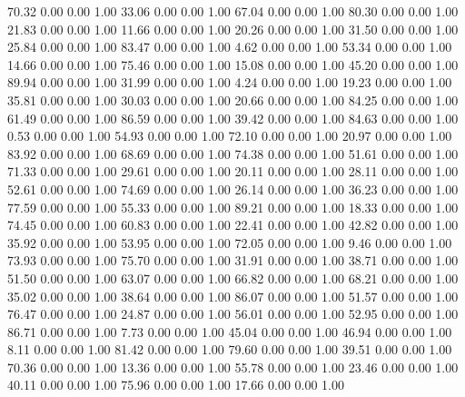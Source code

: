    70.32   0.00   0.00   1.00
   33.06   0.00   0.00   1.00
   67.04   0.00   0.00   1.00
   80.30   0.00   0.00   1.00
   21.83   0.00   0.00   1.00
   11.66   0.00   0.00   1.00
   20.26   0.00   0.00   1.00
   31.50   0.00   0.00   1.00
   25.84   0.00   0.00   1.00
   83.47   0.00   0.00   1.00
    4.62   0.00   0.00   1.00
   53.34   0.00   0.00   1.00
   14.66   0.00   0.00   1.00
   75.46   0.00   0.00   1.00
   15.08   0.00   0.00   1.00
   45.20   0.00   0.00   1.00
   89.94   0.00   0.00   1.00
   31.99   0.00   0.00   1.00
    4.24   0.00   0.00   1.00
   19.23   0.00   0.00   1.00
   35.81   0.00   0.00   1.00
   30.03   0.00   0.00   1.00
   20.66   0.00   0.00   1.00
   84.25   0.00   0.00   1.00
   61.49   0.00   0.00   1.00
   86.59   0.00   0.00   1.00
   39.42   0.00   0.00   1.00
   84.63   0.00   0.00   1.00
    0.53   0.00   0.00   1.00
   54.93   0.00   0.00   1.00
   72.10   0.00   0.00   1.00
   20.97   0.00   0.00   1.00
   83.92   0.00   0.00   1.00
   68.69   0.00   0.00   1.00
   74.38   0.00   0.00   1.00
   51.61   0.00   0.00   1.00
   71.33   0.00   0.00   1.00
   29.61   0.00   0.00   1.00
   20.11   0.00   0.00   1.00
   28.11   0.00   0.00   1.00
   52.61   0.00   0.00   1.00
   74.69   0.00   0.00   1.00
   26.14   0.00   0.00   1.00
   36.23   0.00   0.00   1.00
   77.59   0.00   0.00   1.00
   55.33   0.00   0.00   1.00
   89.21   0.00   0.00   1.00
   18.33   0.00   0.00   1.00
   74.45   0.00   0.00   1.00
   60.83   0.00   0.00   1.00
   22.41   0.00   0.00   1.00
   42.82   0.00   0.00   1.00
   35.92   0.00   0.00   1.00
   53.95   0.00   0.00   1.00
   72.05   0.00   0.00   1.00
    9.46   0.00   0.00   1.00
   73.93   0.00   0.00   1.00
   75.70   0.00   0.00   1.00
   31.91   0.00   0.00   1.00
   38.71   0.00   0.00   1.00
   51.50   0.00   0.00   1.00
   63.07   0.00   0.00   1.00
   66.82   0.00   0.00   1.00
   68.21   0.00   0.00   1.00
   35.02   0.00   0.00   1.00
   38.64   0.00   0.00   1.00
   86.07   0.00   0.00   1.00
   51.57   0.00   0.00   1.00
   76.47   0.00   0.00   1.00
   24.87   0.00   0.00   1.00
   56.01   0.00   0.00   1.00
   52.95   0.00   0.00   1.00
   86.71   0.00   0.00   1.00
    7.73   0.00   0.00   1.00
   45.04   0.00   0.00   1.00
   46.94   0.00   0.00   1.00
    8.11   0.00   0.00   1.00
   81.42   0.00   0.00   1.00
   79.60   0.00   0.00   1.00
   39.51   0.00   0.00   1.00
   70.36   0.00   0.00   1.00
   13.36   0.00   0.00   1.00
   55.78   0.00   0.00   1.00
   23.46   0.00   0.00   1.00
   40.11   0.00   0.00   1.00
   75.96   0.00   0.00   1.00
   17.66   0.00   0.00   1.00
